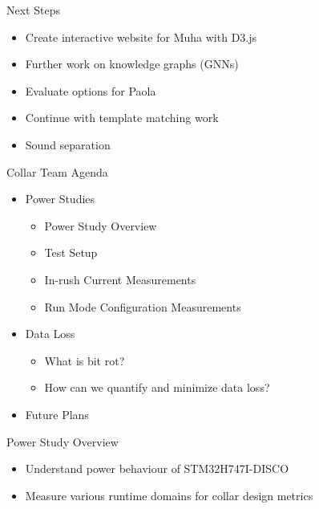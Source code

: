 \begin{frame}{Next Steps}
    \begin{itemize}
        \item Create interactive website for Muha with D3.js
        \item Further work on knowledge graphs (GNNs)
        \item Evaluate options for Paola
        \item Continue with template matching work
        \item Sound separation
    \end{itemize}
\end{frame}

\begin{frame}{Collar Team Agenda}
    \begin{itemize}
        \item Power Studies
        \begin{itemize}
            \item Power Study Overview
            \item Test Setup 
            \item In-rush Current Measurements
            \item Run Mode Configuration Measurements
        \end{itemize}
        \item Data Loss
        \begin{itemize}
            \item What is bit rot?
            \item How can we quantify and minimize data loss?
        \end{itemize}
        \item Future Plans
    \end{itemize}
\end{frame}

\begin{frame}{Power Study Overview}
    \begin{itemize}
        \item Understand power behaviour of STM32H747I-DISCO
        \item Measure various runtime domains for collar design metrics
    \end{itemize}
\end{frame}

